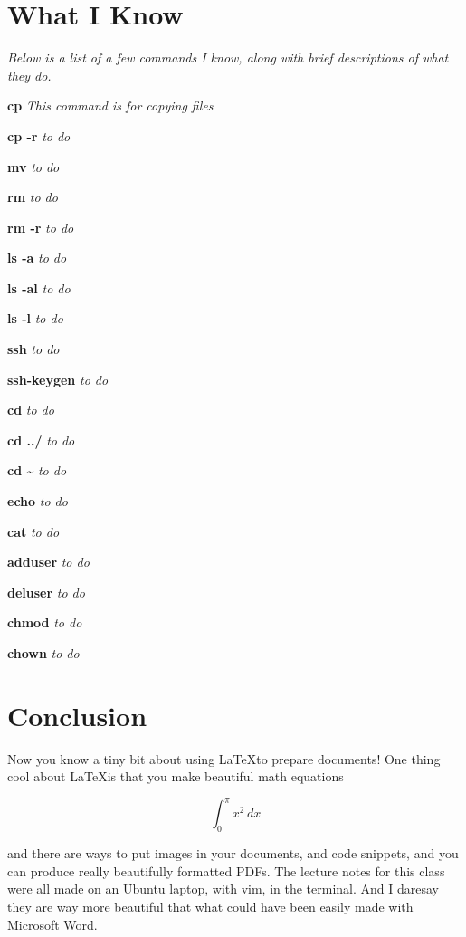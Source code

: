 \documentclass[11pt]{article}
\newcommand{\iknow}[2]{\par\textbf{#1} \textit{#2}}
\begin{document}
\section*{What I Know}

\noindent\textit{Below is a list of a few commands I know, along with brief descriptions of what they do.}
\iknow{cp}{This command is for copying files}
\iknow{cp -r}{to do}
\iknow{mv}{to do}
\iknow{rm}{to do}
\iknow{rm -r}{to do}
\iknow{ls -a}{to do}
\iknow{ls -al}{to do}
\iknow{ls -l}{to do}
\iknow{ssh}{to do}
\iknow{ssh-keygen}{to do}
\iknow{cd}{to do}
\iknow{cd ../}{to do}
\iknow{cd \textasciitilde}{to do}
\iknow{echo}{to do}
\iknow{cat}{to do}
\iknow{adduser}{to do}
\iknow{deluser}{to do}
\iknow{chmod}{to do}
\iknow{chown}{to do}

\section*{Conclusion}
Now you know a tiny bit about using \LaTeX to prepare documents! One thing cool about \LaTeX is that you make beautiful math equations

\begin{equation}
\int_{0}^{\pi}x^2\,dx
\end{equation}

and there are ways to put images in your documents, and code snippets, and you can produce really beautifully formatted PDFs. The lecture notes for this class were all made on an Ubuntu laptop, with vim, in the terminal. And I daresay they are way more beautiful that what could have been easily made with Microsoft Word.
\end{document}
